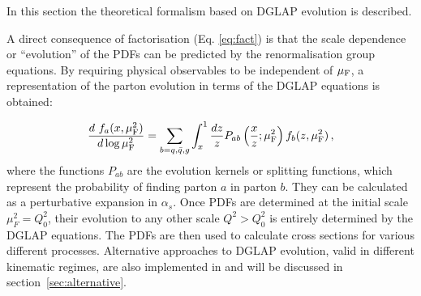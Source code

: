 

%
In this section the theoretical formalism based on DGLAP \cite{Gribov:1972ri,Gribov:1972rt,Lipatov:1974qm,Dokshitzer:1977sg,Altarelli:1977zs} evolution
is described. 

A direct consequence of factorisation (Eq. \ref{eq:fact}) is that the scale dependence or ``evolution'' of the PDFs can be predicted 
by the renormalisation group equations. 
By requiring physical observables to be independent of 
$\mu_\mathrm{F}$, a representation 
of the parton evolution in terms of the DGLAP equations is obtained:

\begin{eqnarray}
\frac{d~f_a(x,\mu_\mathrm{F}^2)}{d \log\mu_\mathrm{F}^2} = \sum_{b=q,\bar{q},g}\int_{x}^{1}\frac{d z}{z} 
P_{ab}\left(\frac{x}{z};\mu_\mathrm{F}^2\right) f_b(z,\mu_\mathrm{F}^2)\,,
\label{eq:dglap}
\end{eqnarray}
%
where the functions $P_{ab}$ are the evolution kernels or splitting functions, which represent the probability 
of finding parton $a$ in parton $b$. They can be calculated as a  perturbative expansion in $\alpha_s$. 
Once PDFs are determined at the initial
scale $\mu_F^2 = Q_0^2$, their evolution to any other scale $Q^2 > Q_0^2$ is entirely determined by the DGLAP equations.
The PDFs are then used to calculate cross sections for various different processes.
Alternative approaches to DGLAP evolution, valid in different kinematic regimes, 
are also implemented in \fitter and will be discussed in section~\ref{sec:alternative}.


